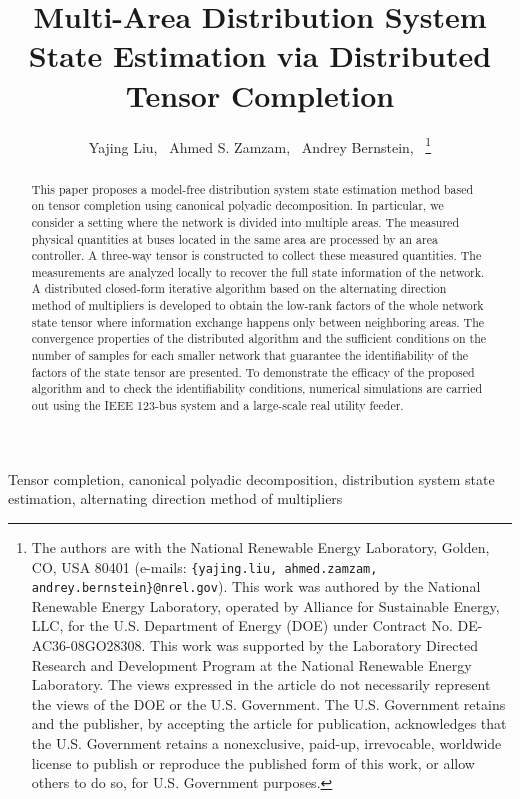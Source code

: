 \documentclass[journal]{IEEEtran}
\newcounter{propose}
\newcounter{thm}
\newcommand{\revision}[1]{{\color{black} #1}} %
\newcommand{\rev}[1]{{\color{black} #1}} %
\begin{document}
    \title{\revision{Multi-Area Distribution System State Estimation via Distributed Tensor Completion}}
     \author{
      Yajing Liu,~
      Ahmed S. Zamzam,~
      Andrey Bernstein,~%
  \thanks{The authors are with the National Renewable Energy Laboratory, Golden, CO, USA 80401 (e-mails: \texttt{\{yajing.liu, ahmed.zamzam,  andrey.bernstein\}@nrel.gov}).\newline
   This work was authored by the National Renewable Energy Laboratory, operated by Alliance for Sustainable Energy, LLC, for the U.S. Department of Energy (DOE) under Contract No. DE-AC36-08GO28308. This work was supported by the Laboratory Directed Research and Development Program at the National
Renewable Energy Laboratory.  The views expressed in the article do not necessarily represent the views of the DOE or the U.S. Government. The U.S. Government retains and the publisher, by accepting the article for publication, acknowledges that the U.S. Government retains a nonexclusive, paid-up, irrevocable, worldwide license to publish or reproduce the published form of this work, or allow others to do so, for U.S. Government purposes.}
  } 

\maketitle



\begin{abstract}
This paper proposes a model-free distribution system state estimation method based on tensor completion using canonical polyadic decomposition. In particular, we consider a setting where the network is divided into multiple areas. The measured physical quantities at buses located in the same area are processed by an area controller. A three-way tensor  is constructed to collect these measured quantities. The measurements are analyzed locally to recover the full state information of the network. A distributed closed-form iterative algorithm based on the alternating direction method of multipliers  is developed to obtain the low-rank factors of the whole network state tensor where information exchange  happens only between neighboring areas. The convergence properties of
the distributed algorithm and the sufficient conditions on the number of samples for each smaller network that guarantee the identifiability of the factors of the state tensor are presented. To demonstrate the efficacy of the proposed algorithm and to check the identifiability conditions, numerical simulations are carried out using the IEEE 123-bus system \rev{and a large-scale real utility feeder}.
\end{abstract}
\begin{IEEEkeywords}
Tensor completion, canonical polyadic decomposition,  distribution system state estimation, alternating direction method of multipliers
\end{IEEEkeywords}
\end{document}
